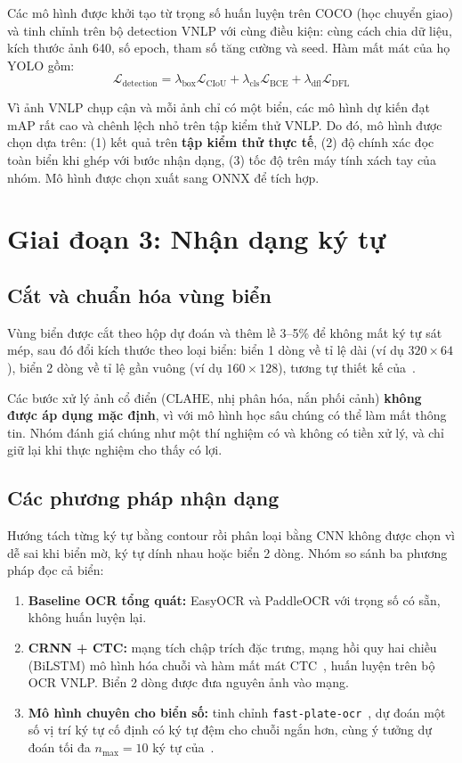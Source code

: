 Các mô hình được khởi tạo từ trọng số huấn luyện trên COCO (học chuyển giao) và tinh chỉnh trên bộ detection VNLP với cùng điều kiện: cùng cách chia dữ liệu, kích thước ảnh 640, số epoch, tham số tăng cường và seed. Hàm mất mát của họ YOLO gồm:
\[
  \mathcal{L}_{\text{detection}} = \lambda_{\text{box}} \mathcal{L}_{\text{CIoU}} + \lambda_{\text{cls}} \mathcal{L}_{\text{BCE}} + \lambda_{\text{dfl}} \mathcal{L}_{\text{DFL}}
\]

Vì ảnh VNLP chụp cận và mỗi ảnh chỉ có một biển, các mô hình dự kiến đạt mAP rất cao và chênh lệch nhỏ trên tập kiểm thử VNLP. Do đó, mô hình được chọn dựa trên: (1) kết quả trên \textbf{tập kiểm thử thực tế}, (2) độ chính xác đọc toàn biển khi ghép với bước nhận dạng, (3) tốc độ trên máy tính xách tay của nhóm. Mô hình được chọn xuất sang ONNX để tích hợp.

\section{Giai đoạn 3: Nhận dạng ký tự}

\subsection{Cắt và chuẩn hóa vùng biển}

Vùng biển được cắt theo hộp dự đoán và thêm lề 3--5\% để không mất ký tự sát mép, sau đó đổi kích thước theo loại biển: biển 1 dòng về tỉ lệ dài (ví dụ $320 \times 64$), biển 2 dòng về tỉ lệ gần vuông (ví dụ $160 \times 128$), tương tự thiết kế của~\cite{trinh2022}.

Các bước xử lý ảnh cổ điển (CLAHE, nhị phân hóa, nắn phối cảnh) \textbf{không được áp dụng mặc định}, vì với mô hình học sâu chúng có thể làm mất thông tin. Nhóm đánh giá chúng như một thí nghiệm có và không có tiền xử lý, và chỉ giữ lại khi thực nghiệm cho thấy có lợi.

\subsection{Các phương pháp nhận dạng}

Hướng tách từng ký tự bằng contour rồi phân loại bằng CNN không được chọn vì dễ sai khi biển mờ, ký tự dính nhau hoặc biển 2 dòng. Nhóm so sánh ba phương pháp đọc cả biển:

\begin{enumerate}
  \item \textbf{Baseline OCR tổng quát:} EasyOCR và PaddleOCR với trọng số có sẵn, không huấn luyện lại.
  \item \textbf{CRNN + CTC:} mạng tích chập trích đặc trưng, mạng hồi quy hai chiều (BiLSTM) mô hình hóa chuỗi và hàm mất mát CTC~\cite{shi2017crnn}, huấn luyện trên bộ OCR VNLP. Biển 2 dòng được đưa nguyên ảnh vào mạng.
  \item \textbf{Mô hình chuyên cho biển số:} tinh chỉnh \texttt{fast-plate-ocr}~\cite{fastplateocr}, dự đoán một số vị trí ký tự cố định có ký tự đệm cho chuỗi ngắn hơn, cùng ý tưởng dự đoán tối đa $n_{\max} = 10$ ký tự của~\cite{trinh2022}.
\end{enumerate}

